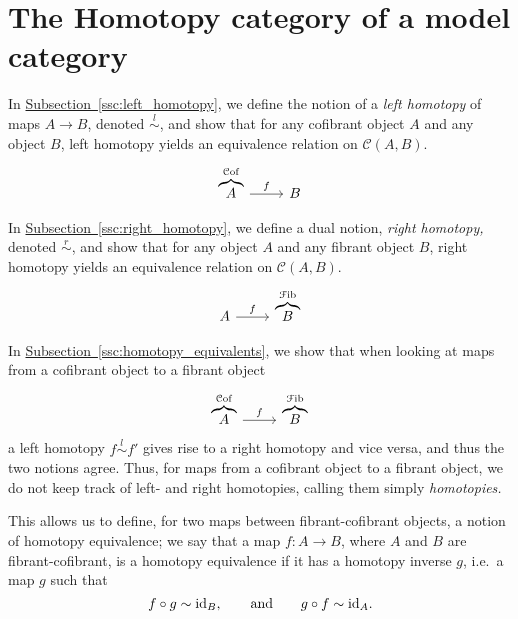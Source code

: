 \documentclass[main.tex]{subfiles}
\begin{document}
\section{The Homotopy category of a model category}
\label{sec:the_homotopy_category_of_a_model_category}

In \hyperref[ssc:left_homotopy]{Subsection~\ref*{ssc:left_homotopy}}, we define the notion of a \emph{left homotopy} of maps $A \to B$, denoted $\overset{l}{\sim}$, and show that for any cofibrant object $A$ and any object $B$, left homotopy yields an equivalence relation on $\mathcal{C}(A, B)$.
\begin{equation*}
  \begin{tikzcd}
    \overbrace{A}^{\cof}
    \arrow[r, "f"]
    & B
  \end{tikzcd}
\end{equation*}

In \hyperref[ssc:right_homotopy]{Subsection~\ref*{ssc:right_homotopy}}, we define a dual notion, \emph{right homotopy,} denoted $\overset{r}{\sim}$, and show that for any object $A$ and any fibrant object $B$, right homotopy yields an equivalence relation on $\mathcal{C}(A, B)$.
\begin{equation*}
  \begin{tikzcd}
    A
    \arrow[r, "f"]
    & \overbrace{B}^{\fib}
  \end{tikzcd}
\end{equation*}

In \hyperref[ssc:homotopy_equivalents]{Subsection~\ref*{ssc:homotopy_equivalents}}, we show that when looking at maps from a cofibrant object to a fibrant object
\begin{equation*}
  \begin{tikzcd}
    \overbrace{A}^{\cof}
    \arrow[r, "f"]
    & \overbrace{B}^{\fib}
  \end{tikzcd}
\end{equation*}
a left homotopy $f \overset{l}{\sim} f'$ gives rise to a right homotopy and vice versa, and thus the two notions agree. Thus, for maps from a cofibrant object to a fibrant object, we do not keep track of left- and right homotopies, calling them simply \emph{homotopies.}

This allows us to define, for two maps between fibrant-cofibrant objects, a notion of homotopy equivalence; we say that a map $f\colon A \to B$, where $A$ and $B$ are fibrant-cofibrant, is a homotopy equivalence if it has a homotopy inverse $g$, i.e.\ a map $g$ such that
\begin{equation*}
  f \circ g \sim \mathrm{id}_{B},\qquad \text{and}\qquad g \circ f \sim \mathrm{id}_{A}.
\end{equation*}
\end{document}
